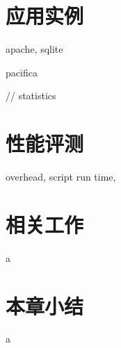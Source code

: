 \section{应用实例}

apache, sqlite

pacifica

// statistics

\section{性能评测}

overhead, script run time, 


\section{相关工作}

a

\section{本章小结}

a

